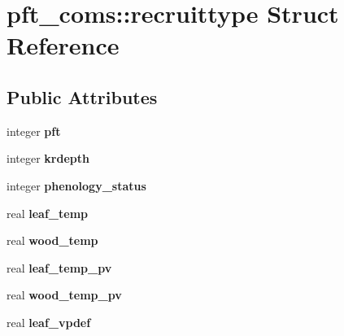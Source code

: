 \hypertarget{structpft__coms_1_1recruittype}{
\section{pft\_\-coms::recruittype Struct Reference}
\label{structpft__coms_1_1recruittype}
}
\subsection*{Public Attributes}
\begin{DoxyCompactItemize}
\item 
\hypertarget{structpft__coms_1_1recruittype_a291b258303c72e665752c00d4d53754d}{
integer {\bfseries pft}}
\label{structpft__coms_1_1recruittype_a291b258303c72e665752c00d4d53754d}

\item 
\hypertarget{structpft__coms_1_1recruittype_a494e5375d5daec0c804b2131b7cd8d31}{
integer {\bfseries krdepth}}
\label{structpft__coms_1_1recruittype_a494e5375d5daec0c804b2131b7cd8d31}

\item 
\hypertarget{structpft__coms_1_1recruittype_a60af6935fa0af178c29704911dc765d0}{
integer {\bfseries phenology\_\-status}}
\label{structpft__coms_1_1recruittype_a60af6935fa0af178c29704911dc765d0}

\item 
\hypertarget{structpft__coms_1_1recruittype_a63277ff3097ef4878f23b2e01624d4c4}{
real {\bfseries leaf\_\-temp}}
\label{structpft__coms_1_1recruittype_a63277ff3097ef4878f23b2e01624d4c4}

\item 
\hypertarget{structpft__coms_1_1recruittype_a39f74782c87f308b9f1578e5f64d2e5f}{
real {\bfseries wood\_\-temp}}
\label{structpft__coms_1_1recruittype_a39f74782c87f308b9f1578e5f64d2e5f}

\item 
\hypertarget{structpft__coms_1_1recruittype_af1ee1e4b91659fcf9eea0ed9da2a96ae}{
real {\bfseries leaf\_\-temp\_\-pv}}
\label{structpft__coms_1_1recruittype_af1ee1e4b91659fcf9eea0ed9da2a96ae}

\item 
\hypertarget{structpft__coms_1_1recruittype_a0d5f8dd1bdc575a902052df9d43d26e5}{
real {\bfseries wood\_\-temp\_\-pv}}
\label{structpft__coms_1_1recruittype_a0d5f8dd1bdc575a902052df9d43d26e5}

\item 
\hypertarget{structpft__coms_1_1recruittype_ae6f181280fb0a62c24a62580f6b76d46}{
real {\bfseries leaf\_\-vpdef}}
\label{structpft__coms_1_1recruittype_ae6f181280fb0a62c24a62580f6b76d46}


\end{DoxyCompactItemize}

